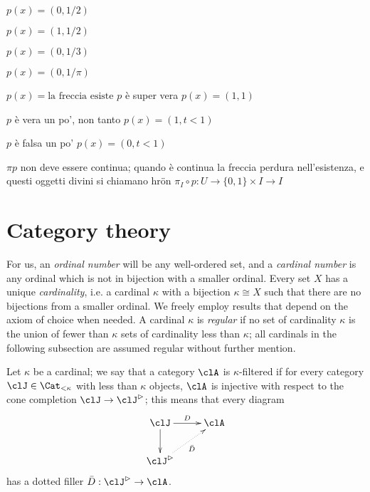 \documentclass{amsart}
\begin{document}
$p(x) = (0,1/2)$

$p(x) = (1,1/2)$


$p(x) = (0,1/3)$

$p(x) = (0,1/\pi)$

$p(x) = \text{la freccia esiste}$
$p$ è super vera
$p(x)=(1,1)$

$p$ è vera un po', non tanto
$p(x) =(1,t<1)$

$p$ è falsa un po'
$p(x) =(0,t<1)$

$\pi p$ non deve essere continua; quando è continua la freccia perdura nell'esistenza, e questi oggetti divini si chiamano hrön
$\pi_I \circ p : U \to \{0,1\}\times I \to I$
\appendix
\section{Category theory}
For us, an \emph{ordinal number} will be any well\hyp{}ordered set, and a \emph{cardinal number} is any ordinal which is not in bijection with a smaller ordinal. Every set $X$ has a unique \emph{cardinality}, i.e. a cardinal $\kappa$ with a bijection $\kappa \cong X$ such that there are no bijections from a smaller ordinal. We freely employ results that depend on the axiom of choice when needed. A cardinal $\kappa$ is \emph{regular} if no set of cardinality $\kappa$ is the union of fewer than $\kappa$ sets of cardinality less than $\kappa$; all cardinals in the following subsection are assumed regular without further mention.

Let $\kappa$ be a cardinal; we say that a category $\clA$ is $\kappa$\hyp{}filtered if for every category $\clJ\in\Cat_{<\kappa}$ with less than $\kappa$ objects, $\clA$ is injective with respect to the cone completion $\clJ\to \clJ^\rhd$; this means that every diagram
\[
  \vcenter{\xymatrix{
      \clJ\ar[d]\ar[r]^D & \clA \\
      \clJ^\rhd\ar@{.>}[ur]_{\bar D}
    }}
\]
has a dotted filler $\bar D : \clJ^\rhd \to \clA$.
\end{document}

